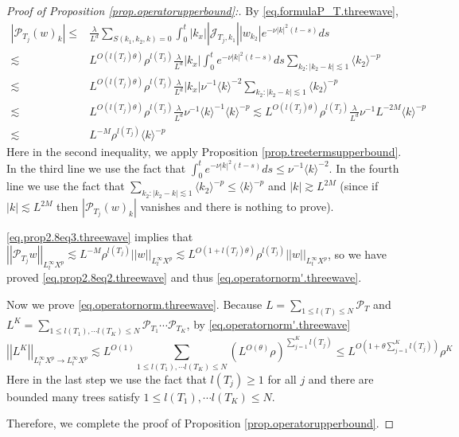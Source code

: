 \begin{proof}[Proof of Proposition \ref{prop.operatorupperbound}:]
By \eqref{eq.formulaP_T.threewave},
\begin{equation}\label{eq.prop2.8eq3.threewave}
\begin{split}
    |\mathcal{P}_{T_j}(w)_k|\le &\frac{\lambda}{L^{d}} \sum\limits_{S(k_1,k_2,k)=0}\int^{t}_0|k_{x}||\mathcal{J}_{T_j,k_1}| |w_{k_2}|e^{- \nu|k|^2(t-s)} ds
    \\
    \lesssim& L^{O(l(T_j)\theta)} \rho^{l(T_j)}\frac{\lambda}{L^{d}}|k_{x}| \int^{t}_0e^{- \nu|k|^2(t-s)} ds \sum_{k_2:|k_2-k|\lesssim 1} \langle k_2\rangle^{-p} 
    \\
    \lesssim& L^{O(l(T_j)\theta)} \rho^{l(T_j)}\frac{\lambda}{L^{d}} |k_{x}| \nu^{-1} \langle k\rangle^{-2} \sum_{k_2:|k_2-k|\lesssim 1} \langle k_2\rangle^{-p} 
    \\
    \lesssim& L^{O(l(T_j)\theta)} \rho^{l(T_j)}\frac{\lambda}{L^{d}} \nu^{-1} \langle k\rangle^{-1}  \langle k\rangle^{-p} \lesssim L^{O(l(T_j)\theta)} \rho^{l(T_j)}\frac{\lambda}{L^{d}} \nu^{-1} L^{-2M}  \langle k\rangle^{-p} 
    \\
    \lesssim& L^{-M} \rho^{l(T_j)} \langle k\rangle^{-p}
\end{split}
\end{equation} 
Here in the second inequality, we apply Proposition \ref{prop.treetermsupperbound}. In the third line we use the fact that $\int^{t}_0e^{- \nu|k|^2(t-s)} ds\le \nu^{-1} \langle k\rangle^{-2}$. In the fourth line we use the fact that $\sum_{k_2:|k_2-k|\lesssim 1} \langle k_2\rangle^{-p}\le \langle k\rangle^{-p}$ and $|k|\gtrsim L^{2M}$ (since if $|k|\lesssim L^{2M}$ then $|\mathcal{P}_{T_j}(w)_k|$ vanishes and there is nothing to prove).

\eqref{eq.prop2.8eq3.threewave} implies that $ \left|\left|\mathcal{P}_{T_j}w\right|\right|_{L_t^{\infty}X^p}\lesssim L^{-M} \rho^{l(T_j)} \left|\left|w\right|\right|_{L_t^{\infty}X^p}\lesssim L^{O(1+l(T_j)\theta)} \rho^{l(T_j)} \left|\left|w\right|\right|_{L_t^{\infty}X^p}$, so we have proved \eqref{eq.prop2.8eq2.threewave} and thus \eqref{eq.operatornorm'.threewave}.

Now we prove \eqref{eq.operatornorm.threewave}. Because $L=\sum_{1\le l(T)\le N} \mathcal{P}_{T}$ and $L^K=\sum_{1\le l(T_1),\cdots l(T_K)\le N} \mathcal{P}_{T_1}\cdots\mathcal{P}_{T_K}$, by \eqref{eq.operatornorm'.threewave} 
\begin{equation}
     \left|\left|L^K\right|\right|_{L_t^{\infty}X^p\rightarrow L_t^{\infty}X^p}\lesssim L^{O(1)} \sum_{1\le l(T_1),\cdots l(T_K)\le N} (L^{O(\theta)}\rho)^{\sum_{j=1}^K l(T_j)}\le L^{O\left(1+\theta \sum_{j=1}^K l(T_j)\right)} \rho^{K}
\end{equation}
Here in the last step we use the fact that $l(T_j)\ge 1$ for all $j$ and there are bounded many trees satisfy $1\le l(T_1),\cdots l(T_K)\le N$.

Therefore, we complete the proof of Proposition \ref{prop.operatorupperbound}.
\end{proof}



